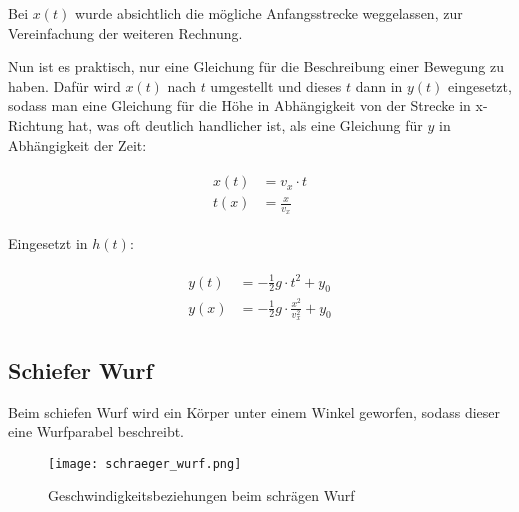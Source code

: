 \noindent Bei $x(t)$ wurde absichtlich die mögliche Anfangsstrecke weggelassen, zur Vereinfachung der weiteren Rechnung.

Nun ist es praktisch, nur eine Gleichung für die Beschreibung einer Bewegung zu haben. Dafür wird $x(t)$ nach $t$ umgestellt und dieses $t$ dann in $y(t)$  eingesetzt, sodass man eine Gleichung für die Höhe in Abhängigkeit von der Strecke in x-Richtung hat, was oft deutlich handlicher ist, als eine Gleichung für $y$ in Abhängigkeit der Zeit:

\begin{align}
\begin{split}
	x(t) &= v_x \cdot t \\
	t(x) &= \frac{x}{v_x}
\end{split}
\end{align}

\noindent Eingesetzt in $h(t)$:

\begin{align} \label{eq:waagerechtgesamt}
\begin{split}
	y(t) &= -\frac{1}{2}g \cdot t^2 + y_0 \\
	y(x) &= -\frac{1}{2}g \cdot \frac{x^2}{v_x^2} + y_0
\end{split}
\end{align}


\subsection{Schiefer Wurf}

Beim schiefen Wurf wird ein Körper unter einem Winkel geworfen, sodass dieser eine Wurfparabel beschreibt.

\begin{figure}[H]
	\centering
	\begin{comment} Gnuplot:
set xlabel "x"
set ylabel "y"
set output "schraeger_wurf.png"
set arrow 3 front to 2.5,3.125 size screen 0.025,22,60 filled ls 1
set arrow 4 front to 2.5,0 size screen 0.025,22,60 filled ls 1
set arrow 5 front to 0,3.125 size screen 0.025,22,60 filled ls 1
set label 1 "v_x" at 1.2,0.3 font 'Verdana,48'
set label 2 "v_0" at 1.2,2.25 font 'Verdana,48'
set label 3 "v_{y0}" at 0.1,1.7 font 'Verdana,48'
plot (-0.26*(x*x)+1.25*x) ls 1
	\end{comment}
	\texttt{[image: schraeger\_wurf.png]}
	\caption{Geschwindigkeitsbeziehungen beim schrägen Wurf}
	\label{fig:abwurf}
\end{figure}

